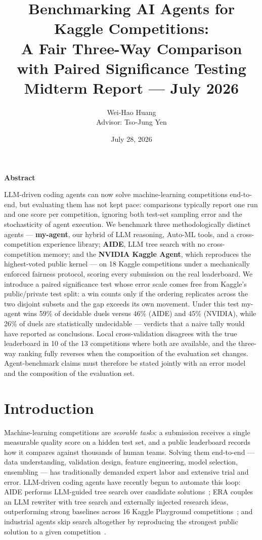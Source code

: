 \documentclass[11pt,a4paper]{article}
\title{\textbf{Benchmarking AI Agents for Kaggle Competitions:\\
A Fair Three-Way Comparison with Paired Significance Testing}\\
\large Midterm Report --- July 2026}
\author{Wei-Hao Huang\\\small Advisor: Tso-Jung Yen}
\date{July 28, 2026}
\begin{document}
\maketitle

\begin{center}\textbf{\large Abstract}\end{center}
\noindent LLM-driven coding agents can now solve machine-learning competitions end-to-end, but evaluating them has not kept pace: comparisons typically report one run and one score per competition, ignoring both test-set sampling error and the stochasticity of agent execution. We benchmark three methodologically distinct agents --- \textbf{my-agent}, our hybrid of LLM reasoning, Auto-ML tools, and a cross-competition experience library; \textbf{AIDE}, LLM tree search with no cross-competition memory; and the \textbf{NVIDIA Kaggle Agent}, which reproduces the highest-voted public kernel --- on 18 Kaggle competitions under a mechanically enforced fairness protocol, scoring every submission on the real leaderboard. We introduce a paired significance test whose error scale comes free from Kaggle's public/private test split: a win counts only if the ordering replicates across the two disjoint subsets and the gap exceeds its own movement. Under this test my-agent wins 59\% of decidable duels versus 46\% (AIDE) and 45\% (NVIDIA), while 26\% of duels are statistically undecidable --- verdicts that a naive tally would have reported as conclusions. Local cross-validation disagrees with the true leaderboard in 10 of the 13 competitions where both are available, and the three-way ranking fully reverses when the composition of the evaluation set changes. Agent-benchmark claims must therefore be stated jointly with an error model and the composition of the evaluation set.

\vspace{0.5em}

\section{Introduction}

Machine-learning competitions are \emph{scorable tasks}: a submission receives a single measurable quality score on a hidden test set, and a public leaderboard records how it compares against thousands of human teams. Solving them end-to-end --- data understanding, validation design, feature engineering, model selection, ensembling --- has traditionally demanded expert labor and extensive trial and error. LLM-driven coding agents have recently begun to automate this loop: AIDE performs LLM-guided tree search over candidate solutions~\cite{aide2025}; ERA couples an LLM rewriter with tree search and externally injected research ideas, outperforming strong baselines across 16 Kaggle Playground competitions~\cite{aygun2026}; and industrial agents skip search altogether by reproducing the strongest public solution to a given competition~\cite{nvidia2026}.
\end{document}
